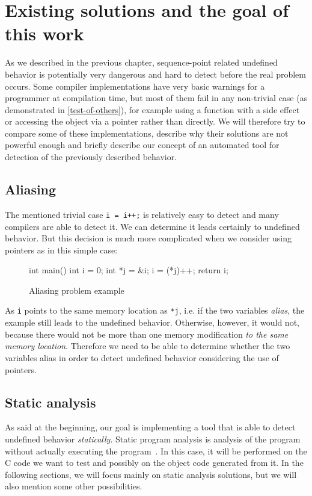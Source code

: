 \chapter{Existing solutions and the goal of this work}
As we described in the previous chapter, sequence-point related undefined behavior is potentially very dangerous and hard to detect before the real problem occurs. Some compiler implementations have very basic warnings for a programmer at compilation time, but most of them fail in any non-trivial case (as demonstrated in \ref{test-of-others}), for example using a function with a side effect or accessing the object via a pointer rather than directly. We will therefore try to compare some of these implementations, describe why their solutions are not powerful enough and briefly describe our concept of an automated tool for detection of the previously described behavior.

\section{Aliasing}
The mentioned trivial case \verb|i = i++;| is relatively easy to detect and many compilers are able to detect it.
We can determine it leads certainly to undefined behavior. But this decision is much more complicated when we consider using pointers as in this simple case:

\begin{figure}[h!]
\caption{Aliasing problem example}
\begin{code}
int main(){
	int i = 0;
	int *j = &i;
	i = (*j)++;
    return i;
}
\end{code}
\end{figure}

As \verb|i| points to the same memory location as \verb|*j|, i.e. if the two variables \emph{alias}, the example still leads to the undefined behavior. Otherwise, however, it would not, because there would not be more than one memory modification \emph{to the same memory location}. Therefore we need to be able to determine whether the two variables alias in order to detect undefined behavior considering the use of pointers.

\section{Static analysis}
As said at the beginning, our goal is implementing a tool that is able to detect undefined behavior \emph{statically}. Static program analysis is analysis of the program without actually executing the program~\cite{static-analysis}. In this case, it will be performed on the C code we want to test and possibly on the object code generated from it. In the following sections, we will focus mainly on static analysis solutions, but we will also mention some other possibilities.

